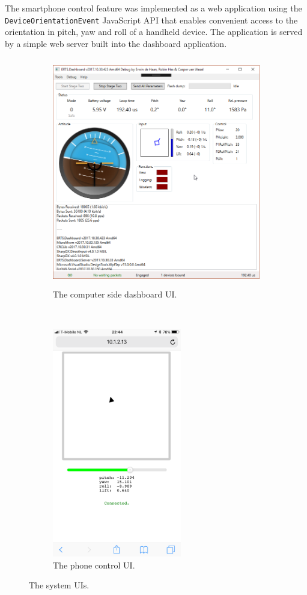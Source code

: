 \documentclass[final]{article}
\begin{document}
The smartphone control feature was implemented as a web application using the \texttt{DeviceOrientationEvent} JavaScript API that enables convenient access to the orientation in pitch, yaw and roll of a handheld device.
The application is served by a simple web server built into the dashboard application.

\begin{figure}[H]
    \begin{subfigure}[b]{0.6\textwidth}
    \centering
        \includegraphics[height=10cm]{resources/dashboard-gui.png}
        \caption{The computer side dashboard UI.}
        \label{fig:pc-dashboard-gui}
    \end{subfigure}
    ~
    \begin{subfigure}[b]{0.4\textwidth}
    \centering
        \includegraphics[height=10cm]{resources/phone-gui.PNG}
        \caption{The phone control UI.}
        \label{fig:phone-control-gui}
    \end{subfigure}
    \caption{The system UIs.}
    \label{fig:system-guis}
\end{figure}
\end{document}
